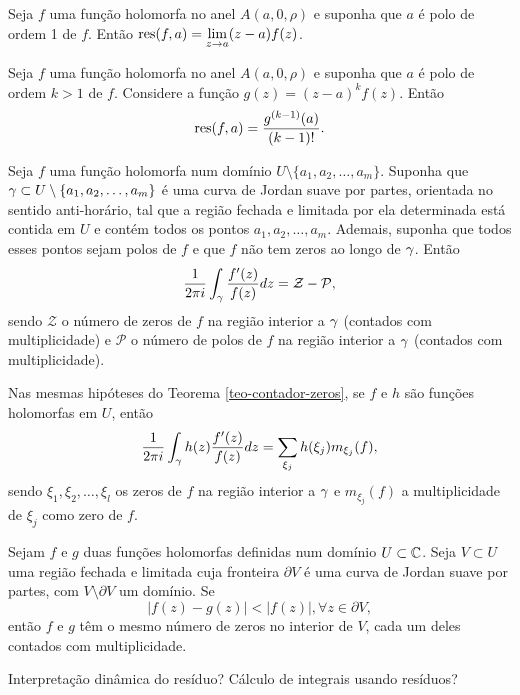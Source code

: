 \begin{proposicao}
Seja $f$ uma função holomorfa no anel $A(a, 0, \rho)$ e suponha que $a$ é polo de ordem 1 de $f$.
Então $\operatorname{res}(f,a) = \displaystyle{ \lim_{z\to a} (z-a) f(z) }$.
\end{proposicao}


\begin{proposicao}
Seja $f$ uma função holomorfa no anel $A(a, 0, \rho)$ e suponha que $a$ é polo de ordem $k>1$ de $f$.
Considere a função $g(z) = (z-a)^k f(z)$. Então
\begin{equation*}
    \operatorname{res}(f, a) = \frac{g^{(k-1)}(a)}{(k-1)!}.
\end{equation*}
\end{proposicao}


\begin{teorema}
\label{teo-contador-zeros}
Seja $f$ uma função holomorfa num domínio $U\setminus\{ a_1, a_2, \dots, a_m \}$. Suponha que 
$\gamma \subset U\setminus\{ a_1, a_2, \dots, a_m \}$ é uma curva de Jordan suave por partes,
orientada no sentido anti-horário, tal que a região fechada e limitada por ela determinada está
contida em $U$ e contém todos os pontos $ a_1, a_2, \dots, a_m$. Ademais, suponha que todos esses
pontos sejam polos de $f$ e que $f$ não tem zeros ao longo de $\gamma$. Então
\begin{equation*}
    \frac{1}{2\pi i}\int_{\gamma} \frac{f'(z)}{f(z)} dz = \mathcal{Z} - \mathcal{P},
\end{equation*}
sendo $\mathcal{Z}$ o número de zeros de $f$ na região interior a $\gamma$ (contados com multiplicidade)
e $\mathcal{P}$ o número de polos de $f$ na região interior a $\gamma$ (contados com multiplicidade).
\end{teorema}


\begin{corolario}
Nas mesmas hipóteses do Teorema \ref{teo-contador-zeros}, se $f$ e $h$ são funções holomorfas em $U$,
então
\begin{equation*}
    \frac{1}{2\pi i}\int_{\gamma} h(z)\frac{f'(z)}{f(z)} dz = \sum_{\xi_j} h(\xi_j)m_{\xi_j}(f),
\end{equation*}
sendo $\xi_1, \xi_2, \dots, \xi_l$ os zeros de $f$ na região interior a $\gamma$ e $m_{\xi_j}(f)$
a multiplicidade de $\xi_j$ como zero de $f$.
\end{corolario}


\begin{teorema}
\label{teo-rouche}
Sejam $f$ e $g$ duas funções holomorfas definidas num domínio $U\subset\mathbb{C}$. Seja $V\subset U$
uma região fechada e limitada cuja fronteira $\partial V$ é uma curva de Jordan suave por partes, com
$V\setminus\partial V$ um domínio. Se
\begin{equation*}
    |f(z) - g(z)| < |f(z)|, \forall z\in\partial V,
\end{equation*}
então $f$ e $g$ têm o mesmo número de zeros no interior de $V$, cada um deles contados com multiplicidade.
\end{teorema}

Interpretação dinâmica do resíduo?
Cálculo de integrais usando resíduos?